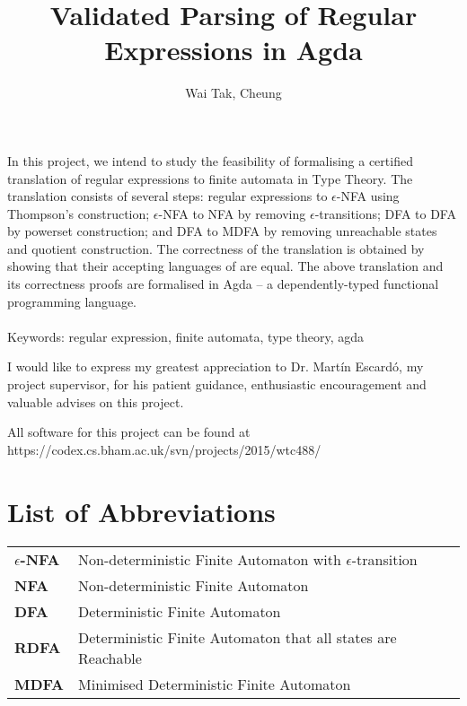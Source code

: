 \documentclass[twoside,openright,final]{bhamthesis}
\title{\textbf{Validated Parsing of Regular Expressions in Agda}}
\author{Wai Tak, Cheung}
\begin{document}
\maketitle

\abstract
\par In this project, we intend to study the feasibility of
formalising a certified translation of regular expressions to finite automata in Type
Theory. The translation consists of several steps: regular expressions
to \(\epsilon\)-NFA using Thompson's
construction; \(\epsilon\)-NFA to NFA by removing
\(\epsilon\)-transitions; DFA to DFA by powerset construction; and DFA
to MDFA by removing unreachable states and quotient construction. The
correctness of the translation is obtained by
showing that their accepting languages of are equal. The above
translation and its correctness proofs are formalised in Agda -- a
dependently-typed functional programming language. 
\\ \\
Keywords: regular expression, finite automata, type theory, agda

\acknowledgments
\par I would like to express my greatest appreciation to Dr. Martín
Escardó, my project supervisor, for his patient guidance, enthusiastic
encouragement and valuable advises on this project. 

\repository
\vspace{7cm}
\begin{center}
  All software for this project can be found at \\
  https://codex.cs.bham.ac.uk/svn/projects/2015/wtc488/
\end{center}

\newpage
\section*{List of Abbreviations}
\begin{tabular}{ll}
  \textbf{\(\epsilon\)-NFA} & Non-deterministic Finite Automaton with
                              \(\epsilon\)-transition \\
  \textbf{NFA} & Non-deterministic Finite Automaton \\
  \textbf{DFA} & Deterministic Finite Automaton \\
  \textbf{RDFA} & Deterministic Finite Automaton that all states are
                  Reachable \\
  \textbf{MDFA} & Minimised Deterministic Finite Automaton
\end{tabular}
\newpage
\end{document}
